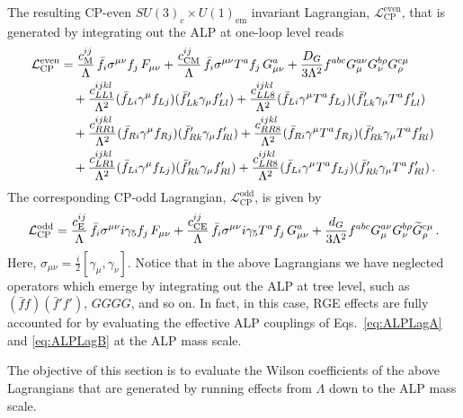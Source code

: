 The resulting CP-even $SU(3)_c \times U(1)_{\text{em}}$ invariant Lagrangian,
$\mathcal{L}^{\text{even}}_{\text{CP}}$, that is generated by integrating out the ALP at
one-loop level reads
\begin{align}
\label{eq:ALPCPELag}
 \mathcal{L}^{\text{even}}_{\text{CP}} &=
\frac{c_{\rm M}^{ij}}{\Lambda} \, \bar{f}_i \sigma^{\mu\nu} f_j \, F_{\mu\nu} +  \frac{c_{\rm CM}^{ij}}{\Lambda} \, \bar{f}_i \sigma^{\mu\nu} T^a f_j \, G^a_{\mu\nu} + \frac{D_G}{3\Lambda^2} f^{abc} G_\mu^{a \nu} G_{\nu}^{b \rho} G_{\rho}^{c \mu} \nonumber \\
& \quad +
\frac{c_{LL1}^{ijkl}}{\Lambda^2}(\bar f_{Li} \gamma^\mu f_{Lj})(\bar f'_{Lk}\gamma_\mu f'_{Ll}) + \frac{c_{LL8}^{ijkl}}{\Lambda^2}(\bar f_{Li} \gamma^\mu T^a f_{Lj})(\bar f'_{Lk}\gamma_\mu T^a f'_{Ll})\nonumber \\
& \quad +
\frac{c_{RR1}^{ijkl}}{\Lambda^2}(\bar f_{Ri} \gamma^\mu f_{Rj})(\bar f'_{Rk}\gamma_\mu f'_{Rl}) +
\frac{c_{RR8}^{ijkl}}{\Lambda^2}(\bar f_{Ri} \gamma^\mu T^a f_{Rj})(\bar f'_{Rk}\gamma_\mu T^a f'_{Rl})\nonumber \\
& \quad +
\frac{c_{LR1}^{ijkl}}{\Lambda^2}(\bar f_{Li} \gamma^\mu f_{Lj})(\bar f'_{Rk}\gamma_\mu f'_{Rl}) +
\frac{c_{LR8}^{ijkl}}{\Lambda^2}(\bar f_{Li} \gamma^\mu T^a f_{Lj})(\bar f'_{Rk}\gamma_\mu T^a f'_{Rl})
\,.
\end{align}
The corresponding CP-odd Lagrangian, $\mathcal{L}^{\text{odd}}_{\text{CP}}$, is given by
\begin{align}
\label{eq:ALPCPOLag}
 \mathcal{L}^{\text{odd}}_{\text{CP}} =
 \frac{c_{\rm E}^{ij}}{\Lambda} \, \bar{f}_i \sigma^{\mu\nu} i\gamma_5 f_j \, F_{\mu\nu} +  \frac{c_{\rm CE}^{ij}}{\Lambda} \, \bar{f}_i \sigma^{\mu\nu} i\gamma_5 T^a f_j \, G^a_{\mu\nu} + \frac{d_G}{3\Lambda^2} f^{abc} G_\mu^{a \nu} G_{\nu}^{b \rho} \widetilde G_{\rho}^{c \mu}\,.
\end{align}
Here, $\sigma_{\mu\nu} = \frac{i}{2}[\gamma_\mu,\gamma_\nu]$.
Notice that in the above Lagrangians we have neglected operators which emerge by integrating
out the ALP at tree level, such as $(\bar{f} f)( \bar{f}' f')$, $GGGG$, and so on.
In fact, in this case, RGE effects are fully accounted for by evaluating the effective ALP
couplings of Eqs.~\eqref{eq:ALPLagA} and \eqref{eq:ALPLagB} at the ALP mass scale.

The objective of this section is to evaluate the Wilson coefficients of the above Lagrangians
that are generated by running effects from $\Lambda$ down to the ALP mass scale.

